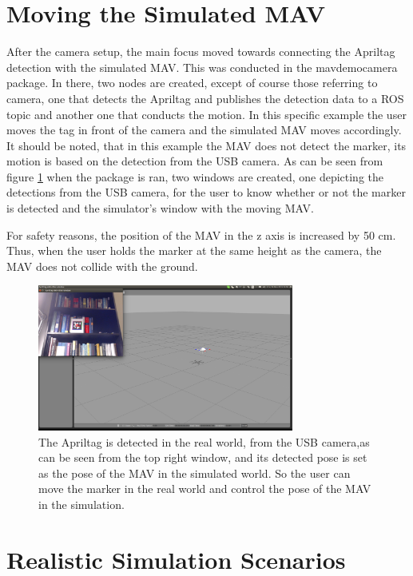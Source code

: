 \section{Moving the Simulated MAV}
\label{sec:movingMAV}
After the camera setup, the main focus moved towards connecting the Apriltag detection with the simulated MAV. This was conducted in the mav\textunderscore demo\textunderscore camera package. In there, two nodes are created, except of course those referring to camera, one that detects the Apriltag and publishes the detection data to a ROS topic and another one that conducts the motion. In this specific example the user moves the tag in front of the camera and the simulated MAV moves accordingly. It should be noted, that in this example the MAV does not detect the marker, its motion is based on the detection from the USB camera. As can be seen from figure \ref{pics:mav_demo_camera} when the package is ran, two windows are created, one depicting the detections from the USB camera, for the user to know whether or not the marker is detected and the simulator's window with the moving MAV.  

For safety reasons, the position of the MAV in the z axis is increased by 50 cm. Thus, when the user holds the marker at the same height as the camera, the MAV does not collide with the ground.

\begin{figure}
   \centering
   \includegraphics[width=0.75\textwidth]{images/mav_demo_camera.pdf}
   \caption{The Apriltag is detected in the real world, from the USB camera,as can be seen from the top right window, and its detected pose is set as the pose of the MAV in the simulated world. So the user can move the marker in the real world and control the pose of the MAV in the simulation.}
   \label{pics:mav_demo_camera}
\end{figure}


\section{Realistic Simulation Scenarios}
\label{sec: apriltagFireflySimulation}

